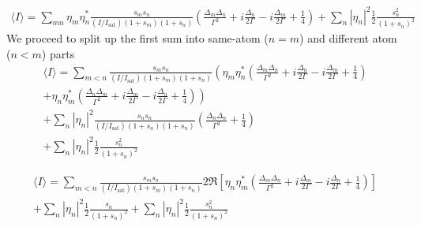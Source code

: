 \documentclass[11pt,letter]{article}
\begin{document}
\begin{multline}
\langle I \rangle = 
  \sum_{mn}  \eta_{m}\eta_{n}^{*}
    \frac{ s_{m} s_{n} } { (I/I_{\mathrm{sat}}) ( 1+s_{m} )( 1+s_{n} ) }
    \left(
        \frac{ \Delta_{m} \Delta_{n} }{ \Gamma^{2} } 
      + i \frac{ \Delta_{n} }{ 2 \Gamma } 
      - i \frac{ \Delta_{m} }{ 2 \Gamma } 
      + \frac{1}{4}  
    \right)  
   + \sum_{n} | \eta_{n}|^{2} \frac{1}{2} \frac{ s_{n}^{2} } { (1 + s _{n} )^{2} } 
\end{multline}
We proceed to split up the first sum into same-atom ($n=m$) and different atom ($n<m$) parts 
\begin{multline}
\langle I \rangle = 
  \sum_{m<n} 
    \frac{ s_{m} s_{n} } { (I/I_{\mathrm{sat}}) ( 1+s_{m} )( 1+s_{n} ) }
    \left(
        \eta_{m}\eta_{n}^{*}
    \left(
        \frac{ \Delta_{m} \Delta_{n} }{ \Gamma^{2} } 
      + i \frac{ \Delta_{n} }{ 2 \Gamma } 
      - i \frac{ \Delta_{m} }{ 2 \Gamma } 
      + \frac{1}{4}  
    \right)  \right. \\
   \left.  + 
        \eta_{n}\eta_{m}^{*}
    \left(
        \frac{ \Delta_{n} \Delta_{m} }{ \Gamma^{2} } 
      + i \frac{ \Delta_{m} }{ 2 \Gamma } 
      - i \frac{ \Delta_{n} }{ 2 \Gamma } 
      + \frac{1}{4}  
    \right) 
    \right)  \\
  + \sum_{n}  |\eta_{n}|^{2}
    \frac{ s_{n} s_{n} } { (I/I_{\mathrm{sat}}) ( 1+s_{n} )( 1+s_{n} ) }
    \left(
        \frac{ \Delta_{n} \Delta_{n} }{ \Gamma^{2} } 
      + \frac{1}{4}  
    \right) \\ 
   + \sum_{n} | \eta_{n}|^{2} \frac{1}{2} \frac{ s_{n}^{2} } { (1 + s _{n} )^{2} } 
\end{multline}

\begin{multline}
\langle I \rangle = 
  \sum_{m<n} 
    \frac{ s_{m} s_{n} } { (I/I_{\mathrm{sat}}) ( 1+s_{m} )( 1+s_{n} ) }
    2 \Re\left[ 
        \eta_{n}\eta_{m}^{*}
    \left(
        \frac{ \Delta_{m} \Delta_{n} }{ \Gamma^{2} } 
      + i \frac{ \Delta_{m} }{ 2 \Gamma } 
      - i \frac{ \Delta_{n} }{ 2 \Gamma } 
      + \frac{1}{4}  
    \right) \right] \\
  + \sum_{n}  |\eta_{n}|^{2}
    \frac{1}{2}	\frac{ s_{n} } { ( 1+s_{n} )^{2} }
   + \sum_{n} | \eta_{n}|^{2} \frac{1}{2} \frac{ s_{n}^{2} } { (1 + s _{n} )^{2} } 
\end{multline}
\end{document}
